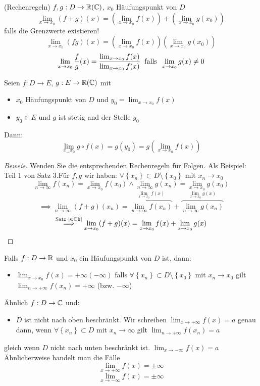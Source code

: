 \begin{Sat}
  (Rechenregeln) $f,g:D\to\mathbb{R}(\mathbb{C})$, $x_0$ Häufungspunkt von $D$
  \[\lim_{x\to x_0}(f+g)(x)=\left( \lim_{x\to x_0} f(x) \right) + \left( \lim_{x\to x_0} g(x_0) \right)\]
  falls die Grenzwerte existieren!
  \[\lim_{x\to x_0}(fg)(x)=\left( \lim_{x\to x_0} f(x) \right) \left( \lim_{x\to x_0} g(x_0) \right)\]
  \[\lim_{x\to x_0}\frac{f}{g}(x)=
\frac{\lim_{x\to x_0} f (x)}{\lim_{x\to x_0} f(x)}\hspace{2mm}
\text{falls}\hspace{2mm}\lim_{x\to x_0}g(x)\neq 0\]
\end{Sat}
\begin{Sat}
  Seien $f:D\to E$, $g:E\to \mathbb{R} (\mathbb{C})$ mit
  \begin{itemize}
    \item $x_0$ Häufungspunkt von $D$ und $y_0=\lim_{x\to x_0}f(x)$
    \item $y_0\in E$ und $g$ ist stetig and der Stelle $y_0$
  \end{itemize}
  Dann:
  \[\lim_{x_\to x_0} g\circ f(x)=g(y_0)=g(\lim_{x\to x_0}f(x))\]
\end{Sat}
\begin{proof}[Beweis]
  Wenden Sie die entsprechenden Rechenregeln für Folgen.
Als Beispiel:
Teil 1 von Satz 3.Für $f,g$ wir haben: $\forall \left\{ x_n \right\}\subset D\setminus \left\{ x_0 \right\}$ mit $x_n\to x_0$
  \[\lim_{n\to \infty} f(x_n)=\lim_{x\to x_0}f(x_0)\wedge\lim_{n\to \infty} g(x_n)=\lim_{x\to x_0}g(x_0)\]
  \[\implies \lim_{n\to\infty}(f+g) (x_n)=\overbrace{\lim_{n\to\infty}f(x_n)}^{\lim_{x\to x_0}f(x)}+\overbrace{\lim_{n\to \infty}g(x_n)}^{\lim_{x\to x_0}g(x)}\]
  \[\stackrel{\text{Satz \ref{s:Ch}}}{\implies}\lim_{x\to x_0}(f+g)(x)=\lim_{x\to x_0} f(x)+\lim_{x\to x_0} g(x)\]
\end{proof}
\begin{Def}
  Falls $f:D\to\mathbb{R}$ und $x_0$ ein Häufungspunkt von $D$ ist, dann:
  \begin{itemize}
    \item $\lim_{x\to x_0}f(x)=+\infty(-\infty)$ falls $\forall \left\{ x_n \right\}\subset D\setminus \left\{ x_0 \right\}$ mit $x_n\to x_0$ gilt $\lim_{n\to +\infty}f(x_n)=+\infty$ (bzw. $-\infty$)
  \end{itemize}
  Ähnlich $f:D\to\mathbb{C}$ und:
  \begin{itemize}
    \item $D$ ist nicht nach oben beschränkt. Wir schreiben $\lim_{x\to+\infty}f(x)=a$ genau dann, wenn $\forall\left\{ x_n \right\}\subset D$ mit $x_n\to\infty$ gilt $\lim_{n\to+\infty}f(x_n)=a$
  \end{itemize}
  gleich wenn $D$ nicht nach unten beschränkt ist. $\lim_{x\to-\infty}f(x)=a$
\"Ahnlicherweise handelt man die F\"alle
  \[\lim_{x\to+\infty}f(x)=\pm\infty\]
  \[\lim_{x\to-\infty}f(x)=\pm\infty\]
\end{Def}
